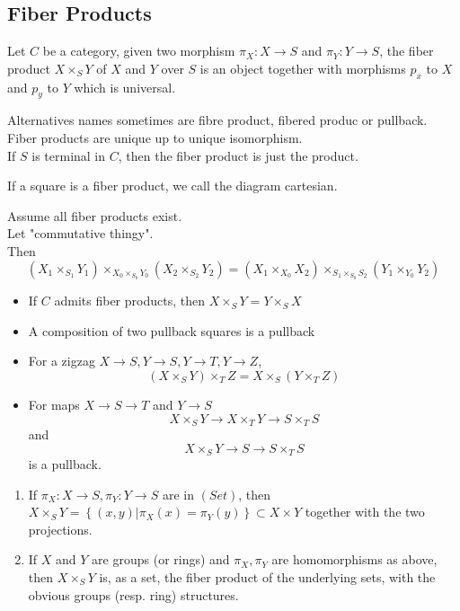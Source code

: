 \documentclass[../main.tex]{subfiles}
\begin{document}
\subsection{Fiber Products}
\begin{defn}
	Let $C$ be a category, given two morphism $\pi_X : X\to S$ and $\pi_Y :Y \to S$, the fiber product $X\times_S Y$ of $X$ and $Y$ over $S$ is an object together with morphisms $p_x$ to $X$ and $p_y$ to $Y$ which is universal.
\end{defn}
\begin{rmq}
Alternatives names sometimes are fibre product, fibered produc or pullback.\\
Fiber products are unique up to unique isomorphism.\\
If $S$ is terminal in $C$, then the fiber product is just the product.
\end{rmq}
\begin{rmq}
If a square is a fiber product, we call the diagram cartesian.
\end{rmq}
\begin{lemma}
Assume all fiber products exist.\\
Let "commutative thingy".\\
Then
\[ 
	( X_1\times_{S_1} Y_1) \times_{X_0\times_{S_0} Y_0} ( X_2 \times_{S_2} Y_2) = ( X_1\times_{X_0} X_2) \times _{S_1\times_{S_0} S_2} ( Y_1\times_{Y_0} Y_2) 
\]

\end{lemma}
\begin{crly}
	\begin{itemize}
	\item If $C$ admits fiber products, then $X\times_S Y = Y \times_S X$
	\item A composition of two pullback squares is a pullback
	\item For a zigzag $X\to S, Y \to S, Y\to T, Y\to Z$,
		\[ 
			( X\times _S Y) \times _T Z = X\times_S( Y\times_T Z) 
		\]
		
	\item For maps $X\to S \to T$ and $Y \to S$ 
		\[ 
		X\times_S Y \to X\times_T Y \to S\times_T S
		\]
		and
	\[ 
	X\times_S Y \to S \to S\times_T S
	\]
		is a pullback.	
	\end{itemize}
\end{crly}
\begin{exemple}
\begin{enumerate}
\item If $\pi_X:X\to S, \pi_Y:Y\to S$ are in $ ( Set) $, then $X\times_S Y = \left\{ ( x,y) | \pi_X( x) = \pi_Y( y)  \right\} \subset X\times Y$ together with the two projections.
\item If $X$ and $Y$ are groups (or rings) and $\pi_X,\pi_Y$ are homomorphisms as above, then $X\times_S Y$ is, as a set, the fiber product of the underlying sets, with the obvious groups (resp. ring) structures.
\end{enumerate}
\end{exemple}
\end{document}
